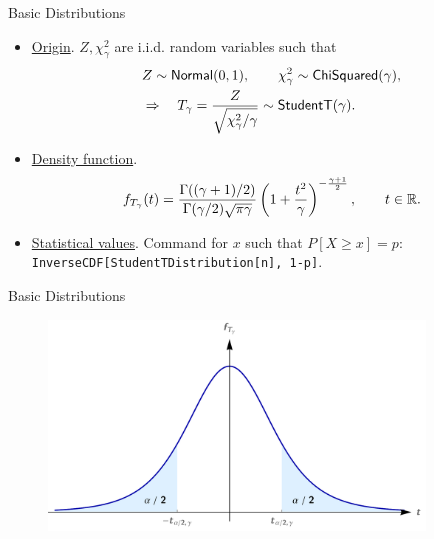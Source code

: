 \begin{frame}{Basic Distributions}

\begin{itemize}
	\item \underline{Origin}. $Z, \chi_{\gamma}^2$ are i.i.d. random variables such that
	\begin{align*}
	& Z \sim \mathsf{Normal}(0, 1), \qquad \chi_{\gamma}^2\sim \mathsf{ChiSquared}(\gamma), \\
	& \Rightarrow \quad T_{\gamma} = \frac{Z}{\sqrt{\chi_{\gamma}^2/\gamma}} \sim \mathsf{StudentT}(\gamma).
	\end{align*}
	\item \underline{Density function}.
	\begin{align*}
	f_{T_{\gamma}}(t) = \frac{\Gamma((\gamma+1)/2)}{\Gamma(\gamma/2)\sqrt{\pi\gamma}}\left(1 + \frac{t^2}{\gamma} \right)^{-\frac{\gamma+1}{2}}, \qquad t\in \mathbb{R}.
	\end{align*}
	\item \underline{Statistical values}. Command for $x$ such that $P[X\geq x] = p$:\\
	\texttt{InverseCDF[StudentTDistribution[n], 1-p]}.
\end{itemize}

\end{frame}

\begin{frame}{Basic Distributions}

\begin{figure}[htbp]
	\centering
	\includegraphics[width=10cm]{./images/rc4fig5.png}
\end{figure}

\end{frame}


